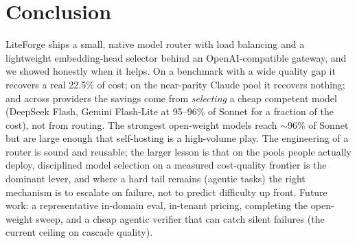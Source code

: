 \documentclass[11pt]{article}
\begin{document}
\section{Conclusion}
LiteForge ships a small, native model router with load balancing and a lightweight
embedding-head selector behind an OpenAI-compatible gateway, and we showed honestly when
it helps. On a benchmark with a wide quality gap it recovers a real 22.5\% of cost; on the
near-parity Claude pool it recovers nothing; and across providers the savings come from
\emph{selecting} a cheap competent model (DeepSeek Flash, Gemini Flash-Lite at 95--96\% of
Sonnet for a fraction of the cost), not from routing. The strongest open-weight models
reach $\sim$96\% of Sonnet but are large enough that self-hosting is a high-volume play.
The engineering of a router is sound and reusable; the larger lesson is that on the pools
people actually deploy, disciplined model selection on a measured cost-quality frontier is
the dominant lever, and where a hard tail remains (agentic tasks) the right mechanism is to
escalate on failure, not to predict difficulty up front. Future work: a representative
in-domain eval, in-tenant pricing, completing the open-weight sweep, and a cheap agentic
verifier that can catch silent failures (the current ceiling on cascade quality).

\small


\end{document}
